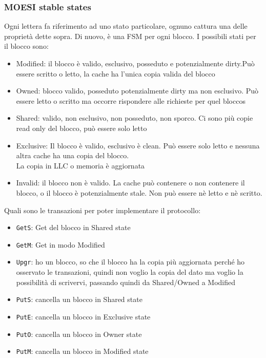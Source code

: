 \documentclass[12pt, oneside]{extbook} %
\begin{document}
\subsubsection{MOESI stable states}
Ogni lettera fa riferimento ad uno stato particolare, ognuno cattura una delle proprietà dette sopra. Di nuovo, è una FSM per ogni blocco. I possibili stati per il blocco sono:
\begin{itemize}
\item Modified: il blocco è valido, esclusivo, posseduto e potenzialmente dirty.Può essere scritto o letto, la cache ha l'unica copia valida del blocco
\item Owned: blocco valido, posseduto potenzialmente dirty ma non esclusivo. Può essere letto o scritto ma occorre rispondere alle richieste per quel bloccos
\item Shared: valido, non esclusivo, non posseduto, non sporco. Ci sono più copie read only del blocco, può essere solo letto
\item Exclusive: Il blocco è valido, esclusivo è clean. Può essere solo letto e nessuna altra cache ha una copia del blocco.\\La copia in LLC o memoria è aggiornata
\item Invalid: il blocco non è valido. La cache può contenere o non contenere il blocco, o il blocco è potenzialmente stale. Non può essere nè letto e nè scritto.
\end{itemize}
Quali sono le transazioni per poter implementare il protocollo:
\begin{itemize}
\item \texttt{GetS}: Get del blocco in Shared state
\item \texttt{GetM}: Get in modo Modified
\item \texttt{Upgr}: ho un blocco, so che il blocco ha la copia più aggiornata perché ho osservato le transazioni, quindi non voglio la copia del dato ma voglio la possibilità di scrivervi, passando quindi da Shared/Owned a Modified
\item \texttt{PutS}: cancella un blocco in Shared state
\item \texttt{PutE}: cancella un blocco in Exclusive state
\item \texttt{PutO}: cancella un blocco in Owner state
\item \texttt{PutM}: cancella un blocco in Modified state
\end{itemize}
\end{document}
